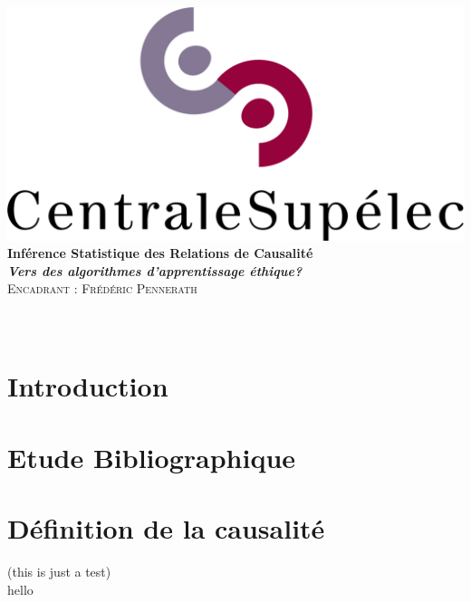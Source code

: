 \documentclass{article}
\author{\Large \textsc{Mohammed FELLAJI, Ahmed BEN AISSA}}
\date{September, 2020}
\begin{document}
\hypersetup{pdfborder=0 0 0} 		%


\makeatletter
  \begin{titlepage}
  \centering
     {\large \textsc{   }}\\
     \vspace{1em}
    \centering
      \includegraphics[width=0.5 \textwidth]{figures/LogoCS.png} \\
    \vspace{4cm}
      {\LARGE\textbf{Inférence Statistique des Relations de Causalité}\\
       \vspace{1em}
       {\large\textbf{
       \textit{\LARGE{Vers des algorithmes d'apprentissage éthique?}}}}\\
    \vspace{4cm}
    \centering
     {\Large \textsc{Encadrant : Frédéric Pennerath}}\\
     \vspace{1em}
        {\Large \@author} \\ 
        \vspace{3em}
        {\Large \@date} }\\
  \end{titlepage}
\makeatother


\tableofcontents




\newpage
\section{Introduction}

\newpage
\section{Etude Bibliographique}


\newpage
\section{Définition de la causalité}
(this is just a test) \\
hello\cite{rubin2005causal}

\newpage
 
\end{document}
